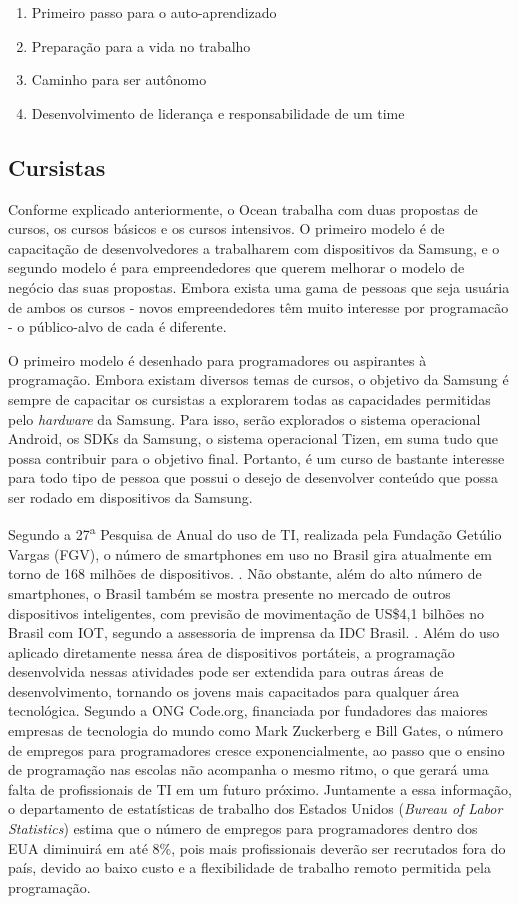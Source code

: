\begin{enumerate}
\item Primeiro passo para o auto-aprendizado
\item Preparação para a vida no trabalho
\item Caminho para ser autônomo
\item Desenvolvimento de liderança e responsabilidade de um time
\end{enumerate}

\subsection{Cursistas}
\label{sec:con_cursistas}

Conforme explicado anteriormente, o Ocean trabalha com duas propostas de cursos, os cursos básicos e os cursos intensivos. O primeiro modelo é de capacitação de desenvolvedores a trabalharem com dispositivos da Samsung, e o segundo modelo é para empreendedores que querem melhorar o modelo de negócio das suas propostas. Embora exista uma gama de pessoas que seja usuária de ambos os cursos - novos empreendedores têm muito interesse por programacão - o público-alvo de cada é diferente.

O primeiro modelo é desenhado para programadores ou aspirantes à programação. Embora existam diversos temas de cursos, o objetivo da Samsung é sempre de capacitar os cursistas a explorarem todas as capacidades permitidas pelo \textit{hardware} da Samsung. Para isso, serão explorados o sistema operacional Android, os SDKs da Samsung, o sistema operacional Tizen, em suma tudo que possa contribuir para o objetivo final. Portanto, é um curso de bastante interesse para todo tipo de pessoa que possui o desejo de desenvolver conteúdo que possa ser rodado em dispositivos da Samsung.

Segundo a 27\textsuperscript{a} Pesquisa de Anual do uso de TI, realizada pela Fundação Getúlio Vargas (FGV), o número de smartphones em uso no Brasil gira atualmente em torno de 168 milhões de dispositivos. \cite{tifgv}. Não obstante, além do alto número de smartphones, o Brasil também se mostra presente no mercado de outros dispositivos inteligentes, com previsão de movimentação de US\$4,1 bilhões no Brasil com IOT, segundo a assessoria de imprensa da IDC Brasil. \cite{idc}. Além do uso aplicado diretamente nessa área de dispositivos portáteis, a programação desenvolvida nessas atividades pode ser extendida para outras áreas de desenvolvimento, tornando os jovens mais capacitados para qualquer área tecnológica. Segundo a ONG Code.org, financiada por fundadores das maiores empresas de tecnologia do mundo como Mark Zuckerberg e Bill Gates, o número de empregos para programadores cresce exponencialmente, ao passo que o ensino de programação nas escolas não acompanha o mesmo ritmo, o que gerará uma falta de profissionais de TI em um futuro próximo. Juntamente a essa informação, o departamento de estatísticas de trabalho dos Estados Unidos (\textit{Bureau of Labor Statistics}) estima que o número de empregos para programadores dentro dos EUA diminuirá em até 8\%, pois mais profissionais deverão ser recrutados fora do país, devido ao baixo custo e a flexibilidade de trabalho remoto permitida pela programação. \cite{bls}

